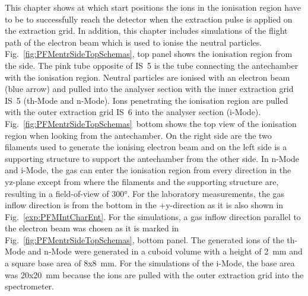 	This chapter shows at which start positions the ions in the ionisation region have to be to successfully reach the detector when the extraction pulse is applied on the extraction grid. In addition, this chapter includes simulations of the flight path of the electron beam which is used to ionise the neutral particles.\\
	Fig.~\ref{fig:PFMentrSideTopSchemas}, top panel shows the ionisation region from the side. The pink tube opposite of IS~5 is the tube connecting the antechamber with the ionisation region. Neutral particles are ionised with an electron beam (blue arrow) and pulled into the analyser section with the inner extraction grid IS~5 (th-Mode and n-Mode). Ions penetrating the ionisation region are pulled with the outer extraction grid IS~6 into the analyser section (i-Mode). Fig.~\ref{fig:PFMentrSideTopSchemas}~bottom shows the top view of the ionisation region when looking from the antechamber. On the right side are the two filaments used to generate the ionising electron beam and on the left side is a supporting structure to support the antechamber from the other side. In n-Mode and i-Mode, the gas can enter the ionisation region from every direction in the yz-plane except from where the filaments and the supporting structure are, resulting in a field-of-view of 300°. For the laboratory measurements, the gas inflow direction is from the bottom in the +y-direction as it is also shown in Fig.~\ref{exp:PFMIntCharEnt}. For the simulations, a gas inflow direction parallel to the electron beam was chosen as it is marked in Fig.~\ref{fig:PFMentrSideTopSchemas}, bottom panel. The generated ions of the th-Mode and n-Mode were generated in a cuboid volume with a height of 2~mm and a square base area of 8x8~mm. For the simulations of the i-Mode, the base area was 20x20~mm because the ions are pulled with the outer extraction grid into the spectrometer.\\
